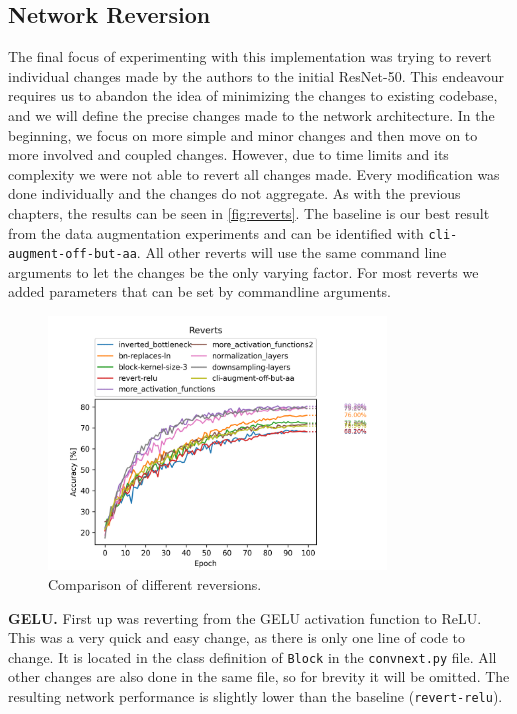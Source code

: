 \documentclass{article}
\begin{document}
\subsection{Network Reversion}\label{subsec:network-reversion}
The final focus of experimenting with this implementation was trying to revert individual changes made by the authors to the initial ResNet-50.
This endeavour requires us to abandon the idea of minimizing the changes to existing codebase, and we will define the precise changes made to the network architecture.
In the beginning, we focus on more simple and minor changes and then move on to more involved and coupled changes.
However, due to time limits and its complexity we were not able to revert all changes made.
Every modification was done individually and the changes do not aggregate.
As with the previous chapters, the results can be seen in \autoref{fig:reverts}.
The baseline is our best result from the data augmentation experiments and can be identified with \texttt{cli-augment-off-but-aa}.
All other reverts will use the same command line arguments to let the changes be the only varying factor.
For most reverts we added parameters that can be set by commandline arguments.

\begin{figure}[h]
    \centering
    \includegraphics[width=0.8\textwidth]{images/reverts}
    \caption{Comparison of different reversions.}
    \label{fig:reverts}
\end{figure}

\textbf{GELU.} %
First up was reverting from the GELU activation function to ReLU\@.
This was a very quick and easy change, as there is only one line of code to change.
It is located in the class definition of \texttt{Block} in the \texttt{convnext.py} file.
All other changes are also done in the same file, so for brevity it will be omitted.
The resulting network performance is slightly lower than the baseline (\texttt{revert-relu}).
\end{document}
